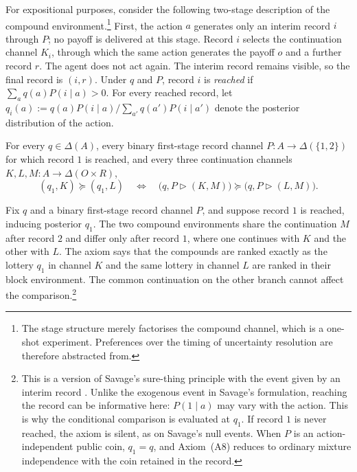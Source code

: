 \documentclass[11pt,a4paper]{article}
\theoremstyle{definition}
\newcommand{\D}{\Delta}
\newcommand{\1}{\mathbf 1}
\begin{document}
For expositional purposes, consider the following two-stage description of the compound environment.\footnote{The stage structure merely factorises the compound channel, which is a one-shot experiment. Preferences over the timing of uncertainty resolution are therefore abstracted from.}
  First, the action $a$ generates only
an interim record $i$ through $P$; no payoff is delivered at this stage.  Record $i$ selects the continuation
channel $K_i$, through which the same action generates the payoff $o$ and a further record $r$.  The agent does not
act again.  The interim record remains visible, so the final record is $(i,r)$.  Under $q$ and $P$, record $i$ is
\emph{reached} if $\sum_aq(a)P(i\mid a)>0$.  For every reached record, let $q_i(a):=q(a)P(i\mid a)/\sum_{a'}q(a')P(i\mid a')$ denote the posterior distribution
of the action.
\begin{description}[leftmargin=*,style=sameline]

\item[(A8) Recordwise sure-thing principle.]
For every $q\in\D(A)$, every binary first-stage record channel $P:A\to\D(\{1,2\})$ for which record $1$ is
reached, and every three continuation channels $K,L,M:A\to\D(O\times R)$,
\begin{equation}
 (q_1,K)\succeq(q_1,L)
 \quad\Longleftrightarrow\quad
 \bigl(q,P\triangleright(K,M)\bigr)
 \succeq
 \bigl(q,P\triangleright(L,M)\bigr).
 \label{eq:recordwise-sure-thing}
\end{equation}

Fix $q$ and a binary first-stage record channel $P$, and suppose record $1$ is reached, inducing posterior $q_1$.
The two compound environments share the continuation $M$ after record $2$ and differ only after record $1$, where
one continues with $K$ and the other with $L$.  The axiom says that the compounds are ranked exactly as the lottery
$q_1$ in channel $K$ and the same lottery in channel $L$ are ranked in their block environment.  The common
continuation on the other branch cannot affect the comparison.\footnote{This is a version of Savage's sure-thing principle
with the event given by an interim record \cite{Savage1954}.  Unlike the exogenous event in Savage's formulation,
reaching the record can be informative here: $P(1\mid a)$ may vary with the action.  This is why the conditional
comparison is evaluated at $q_1$.  If record $1$ is never reached, the axiom is silent, as on Savage's null
events.  When $P$ is an action-independent public coin, $q_1=q$, and
Axiom~\textup{(A8)} reduces to ordinary mixture independence with the coin retained in the record.}

\end{description}
\end{document}
